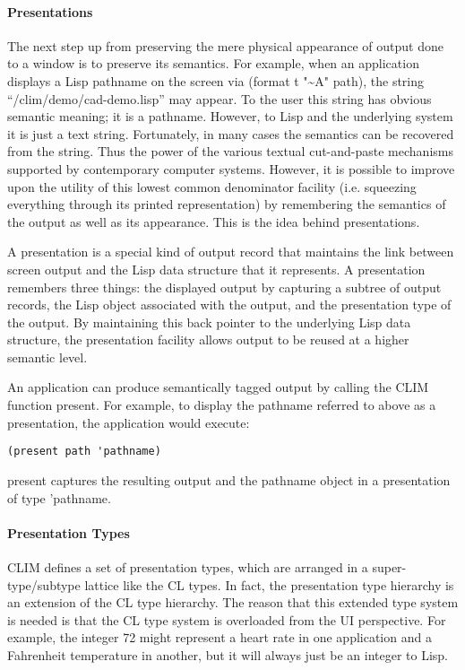\documentclass[twocolumn,a4paper]{article}
\newcommand {\code}[1]{{\sffamily #1}}
\newcommand {\CLIM}{{\small CLIM}}
\let\method\code
\begin{document}
\paragraph*{Presentations} The next step up from preserving the mere physical appearance of output done to a window is to preserve its semantics. For example, when an application displays a Lisp pathname on the screen via \code{(format t "\~{}A" path)}, the string ``/clim/demo/cad-demo.lisp'' may appear. To the user this string has obvious semantic meaning; it is a pathname. However, to Lisp and the underlying system it is just a text string. Fortunately, in many cases the semantics can be recovered from the string. Thus the power of the various textual cut-and-paste mechanisms supported by contemporary computer systems. However, it is possible to improve upon the utility of this lowest common denominator facility (i.e. squeezing everything through its printed representation) by remembering the semantics of the output as well as its appearance. This is the idea behind presentations.

A presentation is a special kind of output record that maintains the link between screen output and the Lisp data structure that it represents. A presentation remembers three things: the displayed output by capturing a subtree of output records, the Lisp object associated with the output, and the presentation type of the output. By maintaining this back pointer to the underlying Lisp data structure, the presentation facility allows output to be reused at a higher semantic level.

An application can produce semantically tagged output by calling the \CLIM{} function \method{present}. For example, to display the pathname referred to above as a presentation, the application would execute:
\begin{lstlisting}
(present path 'pathname)
\end{lstlisting}
\method{present} captures the resulting output and the pathname object in a presentation of type \code{'pathname}.

\paragraph*{Presentation Types} \CLIM{} defines a set of presentation types, which are arranged in a super-type/subtype lattice like the CL types. In fact, the presentation type hierarchy is an extension of the CL type hierarchy. The reason that this extended type system is needed is that the CL type system is overloaded from the UI perspective. For example, the integer 72 might represent a heart rate in one application and a Fahrenheit temperature in another, but it will always just be an integer to Lisp.
\end{document}
